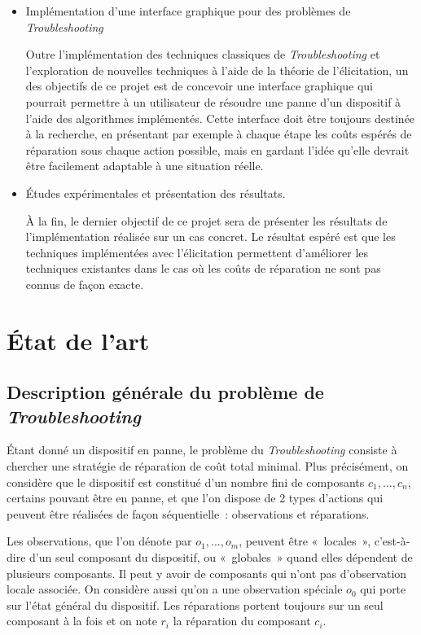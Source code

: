 \documentclass[a4paper,11pt]{article}
\theoremstyle{plain}
\theoremstyle{definition}
\begin{document}
\begin{itemize}
\item Implémentation d'une interface graphique pour des problèmes de \emph{Troubleshooting}

Outre l'implémentation des techniques classiques de \emph{Troubleshooting} et l'exploration de nouvelles techniques à l'aide de la théorie de l'élicitation, un des objectifs de ce projet est de concevoir une interface graphique qui pourrait permettre à un utilisateur de résoudre une panne d'un dispositif à l'aide des algorithmes implémentés. Cette interface doit être toujours destinée à la recherche, en présentant par exemple à chaque étape les coûts espérés de réparation sous chaque action possible, mais en gardant l'idée qu'elle devrait être facilement adaptable à une situation réelle.

\item Études expérimentales et présentation des résultats.

À la fin, le dernier objectif de ce projet sera de présenter les résultats de l'implémentation réalisée sur un cas concret.  Le résultat espéré est que les techniques implémentées avec l'élicitation permettent d'améliorer les techniques existantes dans le cas où les coûts de réparation ne sont pas connus de façon exacte.

\end{itemize}

\section{État de l'art}
\label{SecEtatDeLArt}

\subsection{Description générale du problème de \emph{Troubleshooting}}
\label{SecDescription}

Étant donné un dispositif en panne, le problème du \emph{Troubleshooting} consiste à chercher une stratégie de réparation de coût total minimal. Plus précisément, on considère que le dispositif est constitué d'un nombre fini de composants $c_1, \dotsc, c_n$, certains pouvant être en panne, et que l'on dispose de 2 types d'actions qui peuvent être réalisées de façon séquentielle~: observations et réparations.

Les observations, que l'on dénote par $o_1, \dotsc, o_m$,  peuvent être «~locales~», c'est-à-dire d'un seul composant du dispositif, ou «~globales~» quand elles dépendent de plusieurs composants. Il peut y avoir de composants qui n'ont pas d'observation locale associée. On considère aussi qu'on a une observation spéciale $o_0$ qui porte sur l'état général du dispositif. Les réparations portent toujours sur un seul composant à la fois et on note $r_i$ la réparation du composant $c_i$. 
\end{document}

